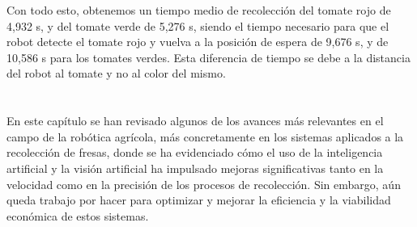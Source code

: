 Con todo esto, obtenemos un tiempo medio de recolección del tomate rojo de 4,932 s, y del tomate verde de 5,276 s, siendo el tiempo necesario para que el robot detecte el tomate rojo y vuelva a la posición de espera de 9,676 s, y de 10,586 s para los tomates verdes. Esta diferencia de tiempo se debe a la distancia del robot al tomate y no al color del mismo.\\
\\
\\
En este capítulo se han revisado algunos de los avances más relevantes en el campo de la robótica agrícola, más concretamente en los sistemas aplicados a la recolección de fresas, donde se ha evidenciado cómo el uso de la inteligencia artificial y la visión artificial ha impulsado mejoras significativas tanto en la velocidad como en la precisión de los procesos de recolección. Sin embargo, aún queda trabajo por hacer para optimizar y mejorar la eficiencia y la viabilidad económica de estos sistemas.









